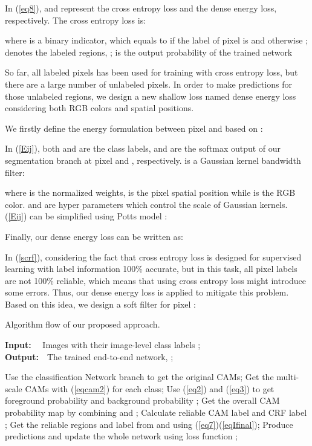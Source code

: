 \documentclass[letterpaper]{article} \usepackage{aaai20}  \usepackage{times}  \usepackage{helvet} \usepackage{courier}  \usepackage[hyphens]{url}  \usepackage{graphicx} \urlstyle{rm} \def\UrlFont{\rm}  \usepackage{graphicx}  \frenchspacing  \setlength{\pdfpagewidth}{8.5in}  \setlength{\pdfpageheight}{11in}
\begin{document}
In (\ref{eq8}),  and  represent the cross entropy loss and the dense energy loss, respectively. The cross entropy loss is:

where  is a binary indicator, which equals to  if the label of pixel  is  and otherwise ;  denotes the labeled regions, ;  is the output probability of the trained network

So far, all labeled pixels has been used for training with cross entropy loss, but there are a large number of unlabeled  pixels. In order to make predictions for those unlabeled regions, we design a new shallow loss named dense energy loss considering both RGB colors and spatial positions.

We firstly define the energy formulation between pixel  and  based on \cite{joy2019efficient}:



In (\ref{Eij}), both  and  are the class labels,  and  are the softmax output of our segmentation branch at pixel  and , respectively.  is a Gaussian kernel bandwidth filter:

where  is the normalized weights,   is the pixel spatial position while  is the RGB color.  and  are hyper parameters which control the scale of Gaussian kernels. (\ref{Eij}) can be simplified using Potts model \cite{tang2018regularized}:


Finally, our dense energy loss can be written as:


In (\ref{scrf}), considering the fact that cross entropy loss is designed for supervised learning with label information 100\% accurate, but in this task, all pixel labels are not 100\% reliable, which means that using cross entropy loss might introduce some errors. Thus, our dense energy loss is applied to mitigate this problem. Based on this idea, we design a soft filter  for pixel :

  


\begin{algorithm}[htb] 
	\caption{Algorithm flow  of our proposed approach.} 
	\label{alg:Framwork} 
		{\bf Input:} ~~Images  with their image-level class labels ;\\
		{\bf Output:}~~The trained end-to-end network, ;
			
	\begin{algorithmic}[1] 		
		\STATE Use the classification Network branch to get the original CAMs;
    	\STATE Get the multi-scale CAMs with (\ref{eqcam2}) for each class;
		\STATE Use (\ref{eq2}) and (\ref{eq3}) to get foreground probability  and background probability ;
		\STATE Get the overall CAM probability map  by combining   and ;
		\STATE Calculate reliable CAM label  and CRF label ;
		\STATE Get the reliable regions and label  from  and  using (\ref{eq7})(\ref{eqIfinal});
		\STATE Produce predictions and update the whole network using loss function ;
		\ENDWHILE
		
	\end{algorithmic}
\end{algorithm}
\end{document}
